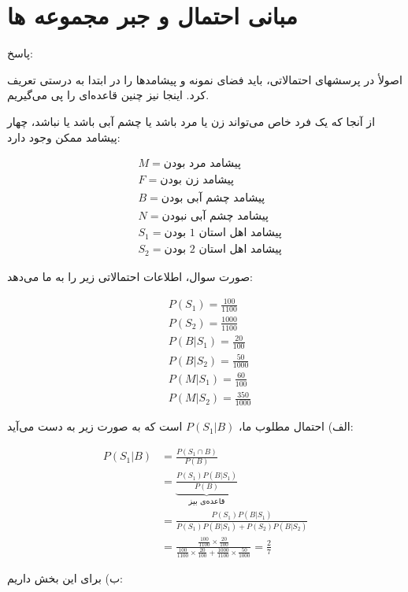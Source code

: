 \documentclass[10pt,letterpaper]{report}
\newcommand{\eqn}[1]{
\[\begin{split}
#1
\end{split}\]
}
\begin{document}
\Large
%

\tableofcontents

\chapter{مبانی احتمال و جبر مجموعه ها}

{\color{red}

پاسخ:

اصولأ در پرسشهای احتمالاتی، باید فضای نمونه و پیشامدها را در ابتدا به درستی تعریف کرد.  اینجا نیز چنین قاعده‌ای را پی می‌گیریم.

از آنجا که یک فرد خاص می‌تواند زن یا مرد باشد یا چشم آبی باشد یا نباشد، چهار پیشامد ممکن وجود دارد:

\eqn{
&
M=\text{
پیشامد مرد بودن
}
\\&
F=\text{
پیشامد زن بودن
}
\\&
B=\text{
پیشامد چشم آبی بودن
}
\\&
N=\text{
پیشامد چشم آبی نبودن
}
\\&
S_1=\text{
پیشامد اهل استان 1 بودن
}
\\&
S_2=\text{
پیشامد اهل استان 2 بودن
}
}

صورت سوال، اطلاعات احتمالاتی زیر را به ما می‌دهد:
\eqn{
&
P(S_1)=\frac{100}{1100}
\\&
P(S_2)=\frac{1000}{1100}
\\&
P(B|S_1)=\frac{20}{100}
\\&
P(B|S_2)=\frac{50}{1000}
\\&
P(M|S_1)=\frac{60}{100}
\\&
P(M|S_2)=\frac{350}{1000}
}

الف) احتمال مطلوب ما،
$P(S_1|B)$
است که به صورت زیر به دست می‌آید:
\eqn{
P(S_1|B)&=
\frac{P(S_1\cap B)}{P(B)}
\\&=
\underbrace{\frac{P(S_1)P(B|S_1)}{P(B)}}_{\text{قاعده‌ی بیز}}
\\&=
\frac{P(S_1)P(B|S_1)}{P(S_1)P(B|S_1)+P(S_2)P(B|S_2)}
\\&=
\frac{
\frac{100}{1100}\times \frac{20}{100}
}{
\frac{100}{1100}\times \frac{20}{100}+\frac{1000}{1100}\times \frac{50}{1000}
}
=\frac{2}{7}
}

ب) برای این بخش داریم:

}
\end{document}
